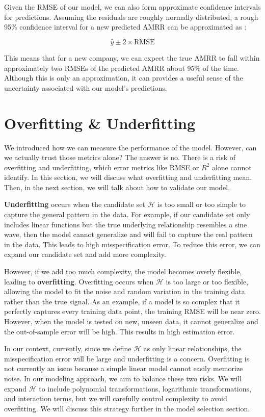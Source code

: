 \documentclass[12pt]{article}
\begin{document}
Given the RMSE of our model, we can also form approximate confidence intervals for predictions. Assuming the residuals are roughly normally distributed, a rough 95\% confidence interval for a new predicted AMRR can be approximated as :

\[
\hat{y} \pm 2 \times \text{RMSE}
\]

This means that for a new company, we can expect the true AMRR to fall within approximately two RMSEs of the predicted AMRR about 95\% of the time. Although this is only an approximation, it can provides a useful sense of the uncertainty associated with our model's predictions.

\section{Overfitting \& Underfitting}

We introduced how we can measure the performance of the model. However, can we actually trust those metrics alone? The answer is no. There is a risk of overfitting and underfitting, which error metrics like RMSE or \( R^2 \) alone cannot identify. In this section, we will discuss what overfitting and underfitting mean. Then, in the next section, we will talk about how to validate our model.

\textbf{Underfitting} occurs when the candidate set \( \mathcal{H} \) is too small or too simple to capture the general pattern in the data. For example, if our candidate set only includes linear functions but the true underlying relationship resembles a sine wave, then the model cannot generalize and will fail to capture the real pattern in the data. This leads to high misspecification error. To reduce this error, we can expand our candidate set and add more complexity. 

However, if we add too much complexity, the model becomes overly flexible, leading to \textbf{overfitting}. Overfitting occurs when \( \mathcal{H} \) is too large or too flexible, allowing the model to fit the noise and random variation in the training data rather than the true signal. As an example, if a model is so complex that it perfectly captures every training data point, the training RMSE will be near zero. However, when the model is tested on new, unseen data, it cannot generalize and the out-of-sample error will be high. This results in high estimation error.

In our context, currently, since we define \( \mathcal{H} \) as only linear relationships, the misspecification error will be large and underfitting is a concern. Overfitting is not currently an issue because a simple linear model cannot easily memorize noise. In our modeling approach, we aim to balance these two risks. We will expand \( \mathcal{H} \) to include polynomial transformations, logarithmic transformations, and interaction terms, but we will carefully control complexity to avoid overfitting. We will discuss this strategy further in the model selection section.
\end{document}
